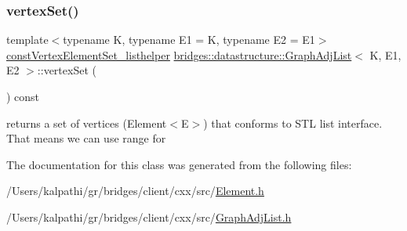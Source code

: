 \subsubsection{\texorpdfstring{vertex\+Set()}{vertexSet()}\hspace{0.1cm}{\footnotesize\ttfamily [2/2]}}
{\footnotesize\ttfamily template$<$typename K, typename E1 = K, typename E2 = E1$>$ \\
\mbox{\hyperlink{classbridges_1_1datastructure_1_1_graph_adj_list_1_1const_vertex_element_set__listhelper}{const\+Vertex\+Element\+Set\+\_\+listhelper}} \mbox{\hyperlink{classbridges_1_1datastructure_1_1_graph_adj_list}{bridges\+::datastructure\+::\+Graph\+Adj\+List}}$<$ K, E1, E2 $>$\+::vertex\+Set (\begin{DoxyParamCaption}{ }\end{DoxyParamCaption}) const\hspace{0.3cm}{\ttfamily [inline]}}



returns a set of vertices (Element$<$\+E$>$) that conforms to S\+TL list interface. That means we can use range for 



The documentation for this class was generated from the following files\+:\begin{DoxyCompactItemize}
\item 
/\+Users/kalpathi/gr/bridges/client/cxx/src/\mbox{\hyperlink{_element_8h}{Element.\+h}}\item 
/\+Users/kalpathi/gr/bridges/client/cxx/src/\mbox{\hyperlink{_graph_adj_list_8h}{Graph\+Adj\+List.\+h}}\end{DoxyCompactItemize}
